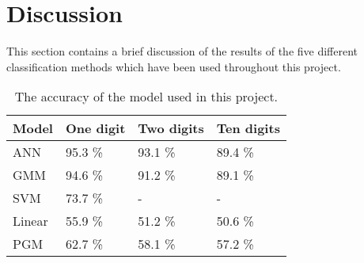 \section*{Discussion}
This section contains a brief discussion of the results of the five different classification methods which have been used throughout this project. 

\begin{table}[h]
\begin{tabular}{@{}l|lll@{}}
\toprule
Model 		   		   & One digit            & Two digits  & Ten digits   \\ \midrule
ANN                    & 95.3 \%                & 93.1 \%   & 89.4 \% \\
GMM                    & 94.6 \%                & 91.2 \%   & 89.1 \% \\
SVM                    & 73.7 \%                & - 	    & -       \\ 
Linear                 & 55.9 \% 				& 51.2 \%   & 50.6 \% \\
PGM                    & 62.7 \% 				& 58.1 \%   & 57.2 \%
\end{tabular}
\caption{The accuracy of the model used in this project. }
\label{table:result}
\end{table}
